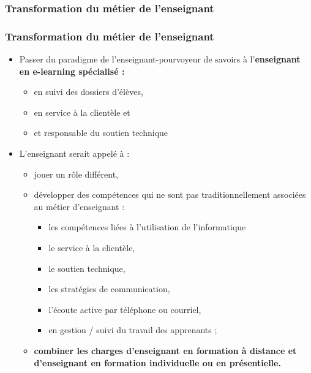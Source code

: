 					\subsubsection{Transformation du métier de l'enseignant} 
						\begin{frame}[allowframebreaks]
						\frametitle{Transformation du métier de l'enseignant}
                        			
                        			\begin{itemize}
                        			\item Passer du paradigme de l’enseignant-pourvoyeur de savoirs à l’\textbf{enseignant en e-learning spécialisé :}
                        				\begin{itemize}
                        				\item en suivi des dossiers d’élèves, 
                        				\item en service à la clientèle et 
                        				\item et responsable du soutien technique 
                        				\end{itemize}
                        			\item L’enseignant serait appelé à :
                        				\begin{itemize}
                        				\item jouer un rôle différent, 
                        				\item développer des compétences qui ne sont pas traditionnellement associées au métier d’enseignant : 
                        					\begin{itemize}
                        					\item les compétences liées à l’utilisation de l’informatique
                        					\item le service à la clientèle, 
                        					\item le soutien technique, 
                        					\item les stratégies de communication, 
                        					\item l’écoute active par téléphone ou courriel, 
                        					\item en gestion / suivi du travail des apprenants ;
                        					\end{itemize}
                        				\item \textbf {combiner les charges d’enseignant en formation à distance et d’enseignant en formation individuelle ou en présentielle.}
                        			\end{itemize}
						\end{itemize}
						\end{frame}		
					
